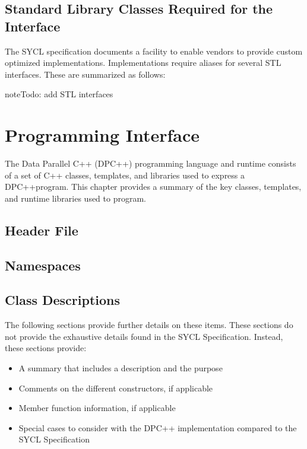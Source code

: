 \documentclass[letterpaper,10pt,english]{sphinxmanual}
\begin{document}
\section{Standard Library Classes Required for the Interface}
\label{\detokenize{language/index:standard-library-classes-required-for-the-interface}}
The SYCL specification documents a facility to enable vendors to provide
custom optimized implementations. Implementations require aliases for
several STL interfaces. These are summarized as follows:

\begin{sphinxadmonition}{note}{\label{\detokenize{language/index:id2}}Todo:}
add STL interfaces
\end{sphinxadmonition}


\chapter{Programming Interface}
\label{\detokenize{programming-interface/index:programming-interface}}\label{\detokenize{programming-interface/index:dpcpp-classes-class-templates-and-defines}}\label{\detokenize{programming-interface/index::doc}}
The Data Parallel C++ (DPC++) programming language and runtime consists
of a set of C++ classes, templates, and libraries used to express a
DPC++program. This chapter provides a summary of the key classes,
templates, and runtime libraries used to program.


\section{Header File}
\label{\detokenize{programming-interface/index:header-file}}

\section{Namespaces}
\label{\detokenize{programming-interface/index:namespaces}}

\section{Class Descriptions}
\label{\detokenize{programming-interface/index:class-descriptions}}
The following sections provide further details on these items. These
sections do not provide the exhaustive details found in the SYCL
Specification. Instead, these sections provide:
\begin{itemize}
\item {} 
A summary that includes a description and the purpose

\item {} 
Comments on the different constructors, if applicable

\item {} 
Member function information, if applicable

\item {} 
Special cases to consider with the DPC++ implementation compared to
the SYCL Specification

\end{itemize}
\end{document}
